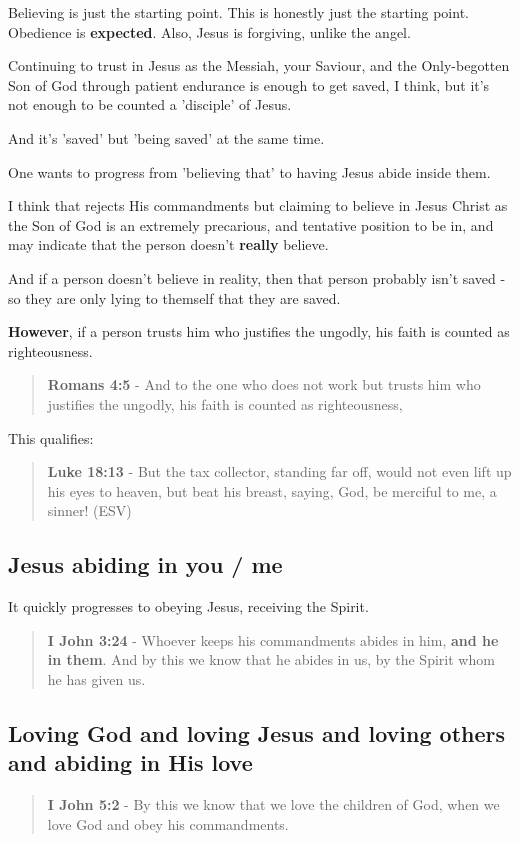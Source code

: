 \documentclass[11pt]{article}
\begin{document}
Believing is just the starting point. This is honestly just the starting point. Obedience is \textbf{expected}. Also, Jesus is forgiving, unlike the angel.

Continuing to trust in Jesus as the Messiah, your Saviour, and the Only-begotten Son of God through patient endurance is enough to get saved, I think, but it's not enough to be counted a 'disciple' of Jesus.

And it's 'saved' but 'being saved' at the same time.

One wants to progress from 'believing that' to having Jesus abide inside them.

I think that rejects His commandments but claiming to believe in Jesus Christ as the Son of God is an extremely precarious, and tentative position to be in,
and may indicate that the person doesn't \textbf{really} believe.

And if a person doesn't believe in reality, then that person probably isn't saved - so they are only lying to themself that they are saved.

\textbf{However}, if a person trusts him who justifies the ungodly, his faith is counted as righteousness.

\begin{quote}
\textbf{Romans 4:5} - And to the one who does not work but trusts him who justifies the ungodly, his faith is counted as righteousness,
\end{quote}

This qualifies:

\begin{quote}
\textbf{Luke 18:13} - But the tax collector, standing far off, would not even lift up his eyes to heaven, but beat his breast, saying, God, be merciful to me, a sinner! (ESV)
\end{quote}

\subsection{Jesus abiding in \textbf{you} / \textbf{me}}
\label{sec:orgc929746}
It quickly progresses to obeying Jesus, receiving the Spirit.

\begin{quote}
\textbf{I John 3:24} - Whoever keeps his commandments abides in him, \textbf{and he in them}. And by this we know that he abides in us, by the Spirit whom he has given us.
\end{quote}

\subsection{Loving God and loving Jesus and loving others and abiding in His love}
\label{sec:org376e983}
\begin{quote}
\textbf{I John 5:2} - By this we know that we love the children of God, when we love God and obey his commandments.
\end{quote}
\end{document}
